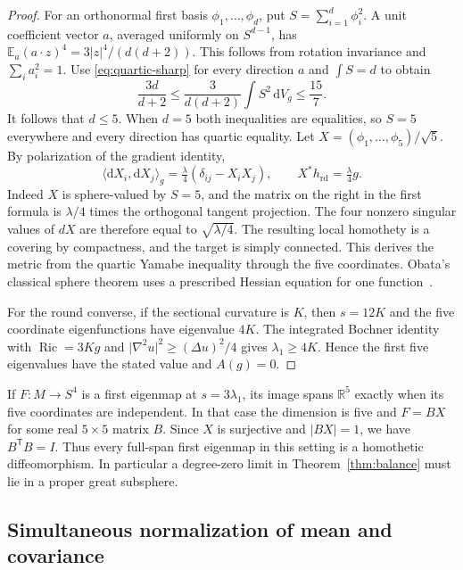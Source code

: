 \documentclass[11pt]{article}
\numberwithin{equation}{section}
\DeclareMathOperator{\Ric}{Ric}
\newcommand{\rd}{\mathrm{rd}}
\newcommand{\dd}{\mathrm{d}}
\newcommand{\RR}{\mathbb{R}}
\newcommand{\ip}[2]{\langle #1,#2\rangle}
\newcommand{\abs}[1]{\lvert #1\rvert}
\newcommand{\dv}{\dd V_g}
\begin{document}
\begin{proof}
For an orthonormal first basis \(\phi_1,\ldots,\phi_d\), put
\(S=\sum_{i=1}^d\phi_i^2\). A unit coefficient vector \(a\),
averaged uniformly on \(S^{d-1}\), has
\(\mathbb E_a(a\cdot z)^4=3\abs z^4/(d(d+2))\). This follows
from rotation invariance and \(\sum_i a_i^2=1\).
Use \eqref{eq:quartic-sharp} for every direction \(a\) and
\(\int S=d\) to obtain
\[
 \frac{3d}{d+2}\le\frac{3}{d(d+2)}\int S^2\,\dv\le\frac{15}{7}.
\]
It follows that \(d\le5\). When \(d=5\) both inequalities
are equalities, so \(S=5\) everywhere and every direction has
quartic equality. Let \(X=(\phi_1,\ldots,\phi_5)/\sqrt5\).
By polarization of the gradient identity,
\begin{equation}\label{eq:point-gram}
 \ip{\dd X_i}{\dd X_j}_g
       =\tfrac{\lambda}{4}(\delta_{ij}-X_iX_j),\qquad
 X^*h_{\rd}=\tfrac{\lambda}{4}g .
\end{equation}
Indeed \(X\) is sphere-valued by \(S=5\), and the matrix on
the right in the first formula is \(\lambda/4\) times the
orthogonal tangent projection. The four nonzero singular
values of \(dX\) are therefore equal to \(\sqrt{\lambda/4}\).
The resulting local homothety is a covering by compactness,
and the target is simply connected. This derives the metric
from the quartic Yamabe inequality through the five coordinates.
Obata's classical sphere theorem uses a prescribed
Hessian equation for one function~\cite[Theorem~A]{Obata1962Sphere}.

For the round converse, if the sectional curvature is \(K\),
then \(s=12K\) and the five coordinate eigenfunctions have
eigenvalue \(4K\). The integrated Bochner identity with
\(\Ric=3Kg\) and \(\abs{\nabla^2 u}^2\ge(\Delta u)^2/4\)
gives \(\lambda_1\ge4K\). Hence the first five eigenvalues
have the stated value and \(A(g)=0\).
\end{proof}

If \(F:M\to S^4\) is a first eigenmap at \(s=3\lambda_1\),
its image spans \(\RR^5\) exactly when its five coordinates
are independent. In that case the dimension is five and
\(F=B X\) for some real \(5\times5\) matrix \(B\).
Since \(X\) is surjective and \(\abs{BX}=1\), we have
\(B^{\mathsf T}B=I\). Thus every full-span first eigenmap in
this setting is a homothetic diffeomorphism. In particular a
degree-zero limit in Theorem~\ref{thm:balance} must lie in a
proper great subsphere.

\subsection{Simultaneous normalization of mean and covariance}
\label{sec:moment-normalization}
\end{document}
